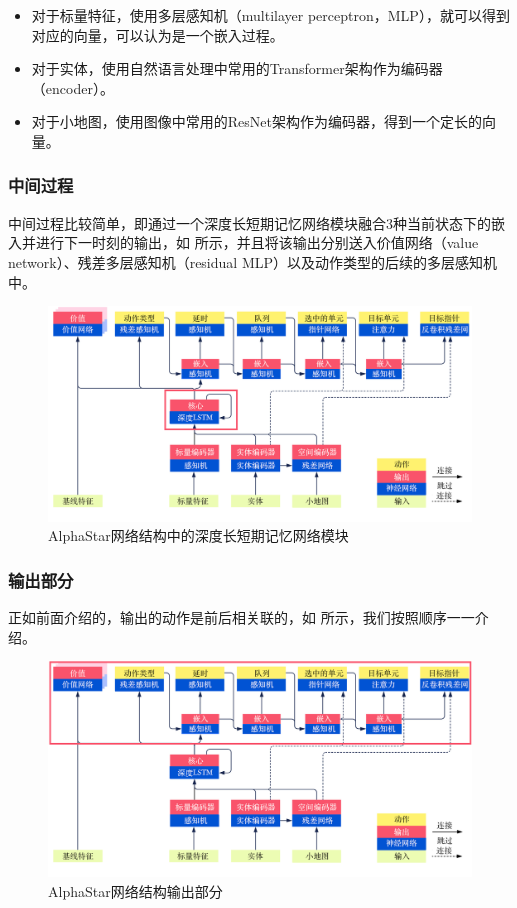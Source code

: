 \begin{itemize}
    \item 对于标量特征，使用多层感知机（multilayer perceptron，MLP），就可以得到对应的向量，可以认为是一个嵌入过程。
    \item 对于实体，使用自然语言处理中常用的Transformer架构作为编码器（encoder）。
    \item 对于小地图，使用图像中常用的ResNet架构作为编码器，得到一个定长的向量。
\end{itemize}

\subsubsection{中间过程} 

中间过程比较简单，即通过一个深度长短期记忆网络模块融合3种当前状态下的嵌入并进行下一时刻的输出，如 所示，并且将该输出分别送入价值网络（value network）、残差多层感知机（residual MLP）以及动作类型的后续的多层感知机中。

\begin{figure}[htb]
    \centering
    \includegraphics[width=0.7\linewidth]{res/ch13/13.5}
    \caption{AlphaStar网络结构中的深度长短期记忆网络模块}
    \label{fig:13_5}
\end{figure}

\subsubsection{输出部分} 

正如前面介绍的，输出的动作是前后相关联的，如 所示，我们按照顺序一一介绍。

\begin{figure}[htb]
    \centering
    \includegraphics[width=0.7\linewidth]{res/ch13/13.6}
    \caption{AlphaStar网络结构输出部分}
    \label{fig:13_6}
\end{figure}

